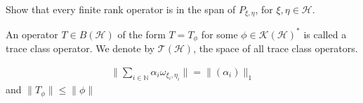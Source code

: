 \begin{exercise}
  Show that every finite rank operator is in the span of $P_{\xi,
  \eta}$, for $  \xi, \eta \in \mathcal{H}$.
\end{exercise}

\begin{definition}
  An operator $T \in B(\mathcal{H})$ of the form $T = T_\phi$ for
  some $\phi \in   \mathcal{K}(\mathcal{H})^*$ is called a trace
  class operator. We denote by $\mathcal{T}(\mathcal{H})$, the space
  of all trace class operators.
\end{definition}

\begin{exercise}
  \begin{align*}
    \Big \| \sum_{i \in \mathbb{N}} \alpha_i \omega_{\xi_i, \eta_i}
    \Big \| = \|(\alpha_i)\|_1
  \end{align*}
  and $\|T_\phi\|\le \|\phi\|$
\end{exercise}
